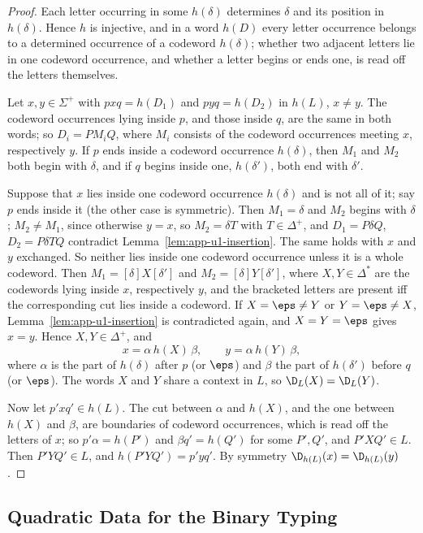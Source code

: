 \begin{proof}
Each letter occurring in some $h(\delta)$ determines $\delta$ and its position in
$h(\delta)$.  Hence $h$ is injective, and in a word $h(D)$ every letter occurrence
belongs to a determined occurrence of a codeword $h(\delta)$; whether two adjacent
letters lie in one codeword occurrence, and whether a letter begins or ends one,
is read off the letters themselves.

Let $x,y\in\Sigma^+$ with $pxq=h(D_1)$ and $pyq=h(D_2)$ in $h(L)$, $x\ne y$.  The
codeword occurrences lying inside $p$, and those inside $q$, are the same in both
words; so $D_i=PM_iQ$, where $M_i$ consists of the codeword occurrences meeting
$x$, respectively $y$.  If $p$ ends inside a codeword occurrence $h(\delta)$, then
$M_1$ and $M_2$ both begin with $\delta$, and if $q$ begins inside one,
$h(\delta')$, both end with $\delta'$.

Suppose that $x$ lies inside one codeword occurrence $h(\delta)$ and is not all
of it; say $p$ ends inside it (the other case is symmetric).  Then $M_1=\delta$
and $M_2$ begins with $\delta$; $M_2\ne M_1$, since otherwise $y=x$, so
$M_2=\delta T$ with $T\in\Delta^+$, and $D_1=P\delta Q$, $D_2=P\delta TQ$ contradict
Lemma~\ref{lem:app-u1-insertion}.  The
same holds with $x$ and $y$ exchanged.  So neither lies inside one codeword
occurrence unless it is a whole codeword.  Then $M_1=[\delta]X[\delta']$ and
$M_2=[\delta]Y[\delta']$, where $X,Y\in\Delta^*$ are the codewords lying inside $x$,
respectively $y$, and the bracketed letters are present iff the corresponding
cut lies inside a codeword.  If $X=\eps\ne Y$ or $Y=\eps\ne X$,
Lemma~\ref{lem:app-u1-insertion} is contradicted again, and $X=Y=\eps$ gives
$x=y$.  Hence $X,Y\in\Delta^+$, and
\[
 x=\alpha\,h(X)\,\beta,\qquad y=\alpha\,h(Y)\,\beta,
\]
where $\alpha$ is the part of $h(\delta)$ after $p$ (or $\eps$) and $\beta$ the
part of $h(\delta')$ before $q$ (or $\eps$).  The words $X$ and $Y$ share a context
in $L$, so $\D_L(X)=\D_L(Y)$.

Now let $p'xq'\in h(L)$.  The cut between $\alpha$ and $h(X)$, and the one between
$h(X)$ and $\beta$, are boundaries of codeword occurrences, which is read off the
letters of $x$; so $p'\alpha=h(P')$ and $\beta q'=h(Q')$ for some $P',Q'$, and
$P'XQ'\in L$.  Then $P'YQ'\in L$, and $h(P'YQ')=p'yq'$.  By symmetry
$\D_{h(L)}(x)=\D_{h(L)}(y)$.
\end{proof}


\subsection{Quadratic Data for the Binary Typing}

